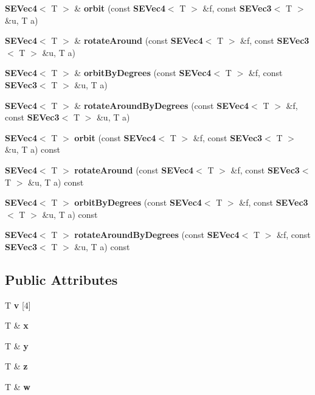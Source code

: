 \begin{DoxyCompactItemize}
{\bf S\+E\+Vec4}$<$ T $>$ \& {\bf orbit} (const {\bf S\+E\+Vec4}$<$ T $>$ \&f, const {\bf S\+E\+Vec3}$<$ T $>$ \&u, T a)
\item 
{\bf S\+E\+Vec4}$<$ T $>$ \& {\bf rotate\+Around} (const {\bf S\+E\+Vec4}$<$ T $>$ \&f, const {\bf S\+E\+Vec3}$<$ T $>$ \&u, T a)
\item 
{\bf S\+E\+Vec4}$<$ T $>$ \& {\bf orbit\+By\+Degrees} (const {\bf S\+E\+Vec4}$<$ T $>$ \&f, const {\bf S\+E\+Vec3}$<$ T $>$ \&u, T a)
\item 
{\bf S\+E\+Vec4}$<$ T $>$ \& {\bf rotate\+Around\+By\+Degrees} (const {\bf S\+E\+Vec4}$<$ T $>$ \&f, const {\bf S\+E\+Vec3}$<$ T $>$ \&u, T a)
\item 
{\bf S\+E\+Vec4}$<$ T $>$ {\bf orbit} (const {\bf S\+E\+Vec4}$<$ T $>$ \&f, const {\bf S\+E\+Vec3}$<$ T $>$ \&u, T a) const 
\item 
{\bf S\+E\+Vec4}$<$ T $>$ {\bf rotate\+Around} (const {\bf S\+E\+Vec4}$<$ T $>$ \&f, const {\bf S\+E\+Vec3}$<$ T $>$ \&u, T a) const 
\item 
{\bf S\+E\+Vec4}$<$ T $>$ {\bf orbit\+By\+Degrees} (const {\bf S\+E\+Vec4}$<$ T $>$ \&f, const {\bf S\+E\+Vec3}$<$ T $>$ \&u, T a) const 
\item 
{\bf S\+E\+Vec4}$<$ T $>$ {\bf rotate\+Around\+By\+Degrees} (const {\bf S\+E\+Vec4}$<$ T $>$ \&f, const {\bf S\+E\+Vec3}$<$ T $>$ \&u, T a) const 
\end{DoxyCompactItemize}
\subsection*{Public Attributes}
\begin{DoxyCompactItemize}
\item 
T {\bf v} [4]
\item 
T \& {\bf x}
\item 
T \& {\bf y}
\item 
T \& {\bf z}
\item 
T \& {\bf w}
\end{DoxyCompactItemize}
